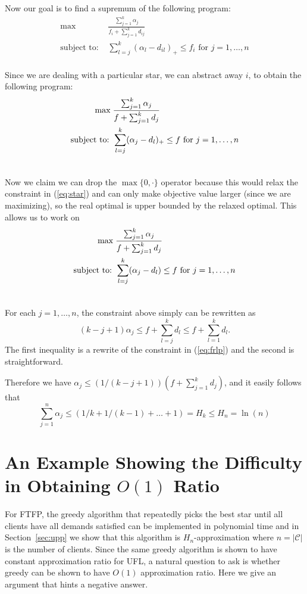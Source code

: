 \documentclass[oneside,final]{ucr}
\begin{document}
Now our goal is to find a supremum of the following program:
\begin{align*}
  \max\; & \frac{\sum_{j=1}^k \alpha_j}{f_i + \sum_{j=1}^k d_{ij}}\\
  \textrm{subject to: } & \sum_{l=j}^k (\alpha_l -
  d_{il})_+\leq f_i \textrm{ for } j=1,\ldots,n\\
\end{align*}

Since we are dealing with a particular star, we can abstract
away $i$, to obtain the following program:
\begin{align}
  \label{eq:star}
  \max\; & \frac{\sum_{j=1}^k \alpha_j}{f + \sum_{j=1}^k
    d_j}\\ \notag
  \textrm{subject to: } & \sum_{l=j}^k (\alpha_j - d_{l})_+
  \leq f \textrm{ for } j=1,\ldots,n\\ \notag
\end{align}

Now we claim we can drop the $\max\{0, \cdot\}$ operator
because this would relax the constraint in (\ref{eq:star})
and can only make objective value larger (since we are
maximizing), so the real optimal is upper bounded by the
relaxed optimal. This allows us to work on
\begin{align}
  \label{eq:frlp}
  \max\; & \frac{\sum_{j=1}^k \alpha_j}{f + \sum_{j=1}^k
    d_j}\\ \notag
  \textrm{subject to: } & \sum_{l=j}^k (\alpha_j - d_{l})
  \leq f \textrm{ for } j=1,\ldots,n\\ \notag
\end{align}

For each $j=1,\ldots,n$, the constraint above simply can be
rewritten as
\begin{equation}
  (k-j+1) \alpha_j \leq f + \sum_{l=j}^k d_l \leq f +
  \sum_{l=1}^k d_l.
\end{equation}
The first inequality is a rewrite of the constraint in
(\ref{eq:frlp}) and the second is straightforward.

Therefore we have $\alpha_j \leq (1/(k-j+1)) (f +
\sum_{j=1}^k d_j)$, and it easily follows that
\begin{equation}
  \sum_{j=1}^n \alpha_j \leq (1/k + 1/(k-1) + \ldots + 1) =
  H_k \leq H_n = \ln(n)
\end{equation}

\section{An Example Showing the Difficulty in Obtaining $O(1)$ Ratio}
For FTFP, the greedy algorithm that repeatedly picks the best star
until all clients have all demands satisfied can be implemented in
polynomial time and in Section~\ref{sec:upp} we show that this
algorithm is $H_n$-approximation where $n=|\mathcal C|$ is the number
of clients. Since the same greedy algorithm is shown to have constant
approximation ratio for UFL, a natural question to ask is whether
greedy can be shown to have $O(1)$ approximation ratio. Here we give
an argument that hints a negative answer.
\end{document}
